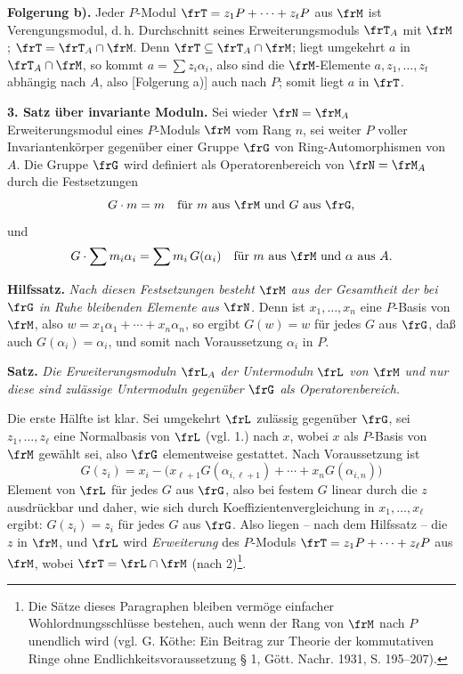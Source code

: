 \noindent\textbf{Folgerung b).} Jeder \(P\)-Modul \(\frT=z_1P+\cdots+z_tP\) aus \(\frM\) ist Verengungsmodul, d.\,h. Durchschnitt seines Erweiterungsmoduls \(\frT_A\) mit \(\frM\); \(\frT=\frT_A\cap\frM\). Denn \(\frT\subseteq \frT_A\cap\frM\); liegt umgekehrt \(a\) in \(\frT_A\cap\frM\), so kommt \(a=\sum z_i\alpha_i\), also sind die \(\frM\)-Elemente \(a,z_1,\ldots,z_t\) abhängig nach \(A\), also [Folgerung a)] auch nach \(P\); somit liegt \(a\) in \(\frT\).

\noindent\textbf{3. Satz über invariante Moduln.} Sei wieder \(\frN=\frM_A\) Erweiterungsmodul eines \(P\)-Moduls \(\frM\) vom Rang \(n\), sei weiter \(P\) voller Invariantenkörper gegenüber einer Gruppe \(\frG\) von Ring-Automorphismen von \(A\). Die Gruppe \(\frG\) wird definiert als Operatorenbereich von \(\frN=\frM_A\) durch die Festsetzungen
\[
        G\cdot m=m\quad\text{für }m\text{ aus }\frM\text{ und }G\text{ aus }\frG,
\]
und
\[
        G\cdot\sum m_i\alpha_i=\sum m_i\,G(\alpha_i)
        \quad\text{für }m\text{ aus }\frM\text{ und }\alpha\text{ aus }A.
\]

\noindent\textbf{Hilfssatz.} \emph{Nach diesen Festsetzungen besteht \(\frM\) aus der Gesamtheit der bei \(\frG\) in Ruhe bleibenden Elemente aus \(\frN\).} Denn ist \(x_1,\ldots,x_n\) eine \(P\)-Basis von \(\frM\), also \(w=x_1\alpha_1+\cdots+x_n\alpha_n\), so ergibt \(G(w)=w\) für jedes \(G\) aus \(\frG\), daß auch \(G(\alpha_i)=\alpha_i\), und somit nach Voraussetzung \(\alpha_i\) in \(P\).

\noindent\textbf{Satz.} \emph{Die Erweiterungsmoduln \(\frL_A\) der Untermoduln \(\frL\) von \(\frM\) und nur diese sind zulässige Untermoduln gegenüber \(\frG\) als Operatorenbereich.}

Die erste Hälfte ist klar. Sei umgekehrt \(\frL\) zulässig gegenüber \(\frG\), sei \(z_1,\ldots,z_\ell\) eine Normalbasis von \(\frL\) (vgl. 1.) nach \(x\), wobei \(x\) als \(P\)-Basis von \(\frM\) gewählt sei, also \(\frG\) elementweise gestattet. Nach Voraussetzung ist
\[
        G(z_i)=x_i-\bigl(x_{\ell+1}G(\alpha_{i,\ell+1})
              +\cdots+x_nG(\alpha_{i,n})\bigr)
\]
Element von \(\frL\) für jedes \(G\) aus \(\frG\), also bei festem \(G\) linear durch die \(z\) ausdrückbar und daher, wie sich durch Koeffizientenvergleichung in \(x_1,\ldots,x_\ell\) ergibt: \(G(z_i)=z_i\) für jedes \(G\) aus \(\frG\). Also liegen -- nach dem Hilfssatz -- die \(z\) in \(\frM\), und \(\frL\) wird \emph{Erweiterung} des \(P\)-Moduls \(\frT=z_1P+\cdots+z_\ell P\) aus \(\frM\), wobei \(\frT=\frL\cap\frM\) (nach 2)\footnote{Die Sätze dieses Paragraphen bleiben vermöge einfacher Wohlordnungsschlüsse bestehen, auch wenn der Rang von \(\frM\) nach \(P\) unendlich wird (vgl. G. Köthe: Ein Beitrag zur Theorie der kommutativen Ringe ohne Endlichkeitsvoraussetzung § 1, Gött. Nachr. 1931, S. 195--207).}.

